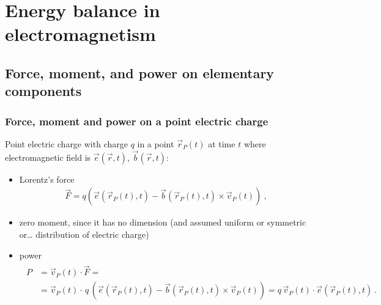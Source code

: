 \documentclass[letterpaper,10pt,italian]{jupyterBook}
\begin{document}
\sphinxstepscope




\chapter{Energy balance in electromagnetism}
\label{\detokenize{ch/energy:energy-balance-in-electromagnetism}}\label{\detokenize{ch/energy:classical-electromagnetism-energy}}\label{\detokenize{ch/energy::doc}}

\section{Force, moment, and power on elementary components}
\label{\detokenize{ch/energy:force-moment-and-power-on-elementary-components}}

\subsection{Force, moment and power on a point electric charge}
\label{\detokenize{ch/energy:force-moment-and-power-on-a-point-electric-charge}}
\sphinxAtStartPar
Point electric charge with charge \(q\) in a point \(\vec{r}_P(t)\) at time \(t\) where electromagnetic field is \(\vec{e}(\vec{r},t)\), \(\vec{b}(\vec{r},t)\):
\begin{itemize}
\item {} 
\sphinxAtStartPar
Lorentz’s force
\begin{equation*}
\begin{split}\vec{F} = q \left( \vec{e}(\vec{r}_P(t), t) - \vec{b}(\vec{r}_P(t),t) \times \vec{v}_P(t) \right) \ ,\end{split}
\end{equation*}
\item {} 
\sphinxAtStartPar
zero moment, since it has no dimension (and assumed uniform or symmetric or… distribution of electric charge)

\item {} 
\sphinxAtStartPar
power
\begin{equation*}
\begin{split}\begin{aligned}
     P & = \vec{v}_P(t) \cdot \vec{F} = \\
       & = \vec{v}_P(t) \cdot \, q \, \left( \vec{e}(\vec{r}_P(t), t) - \vec{b}(\vec{r}_P(t), t) \times \vec{v}_P(t) \right) = q \, \vec{v}_P(t) \cdot \vec{e}(\vec{r}_P(t),t) \ .
   \end{aligned}\end{split}
\end{equation*}
\end{itemize}
\end{document}
